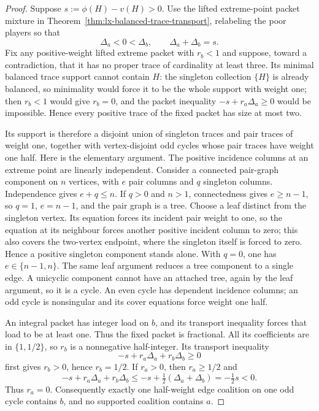 \begin{proof}
Suppose $s:=\phi(H)-v(H)>0$.  Use the lifted extreme-point packet mixture in
Theorem~\ref{thm:lx-balanced-trace-transport}, relabeling the poor players so
that
\[
 \Delta_a<0<\Delta_b,\qquad \Delta_a+\Delta_b=s.
 \tag{RT-1}\label{eq:lx-rank-two-signs}
\]
Fix any positive-weight lifted extreme packet with $r_b<1$ and suppose,
toward a contradiction, that it has no proper trace of cardinality at least
three.  Its minimal balanced trace support cannot contain $H$: the singleton
collection $\{H\}$ is already balanced, so minimality would force it to be
the whole support with weight one; then $r_b<1$ would give $r_b=0$, and the
packet inequality $-s+r_a\Delta_a\geq0$ would be impossible.  Hence every
positive trace of the fixed packet has size at most two.

Its support is therefore a disjoint union of singleton traces and pair
traces of weight one, together with vertex-disjoint odd cycles whose pair
traces have weight one half.  Here is the elementary argument.  The positive
incidence columns at an extreme point are linearly independent.  Consider a
connected pair-graph component on $n$ vertices, with $e$ pair columns and $q$
singleton columns.  Independence gives $e+q\leq n$.  If $q>0$ and $n>1$,
connectedness gives $e\geq n-1$, so $q=1$, $e=n-1$, and the pair graph is a
tree.  Choose a leaf distinct from the singleton vertex.  Its equation forces
its incident pair weight to one, so the equation at its neighbour forces
another positive incident column to zero; this also covers the two-vertex
endpoint, where the singleton itself is forced to zero.  Hence a positive
singleton component stands alone.  With $q=0$, one has
$e\in\{n-1,n\}$.  The same leaf argument reduces a tree component to a single
edge.  A unicyclic component cannot have an attached tree, again by the leaf
argument, so it is a cycle.  An even cycle has dependent incidence columns;
an odd cycle is nonsingular and its cover equations force weight one half.

An integral packet has integer load on $b$, and its transport inequality
forces that load to be at least one.  Thus the fixed packet is fractional.
All its coefficients are in $\{1,1/2\}$, so $r_b$ is a
nonnegative half-integer.  Its transport inequality
\[
 -s+r_a\Delta_a+r_b\Delta_b\geq0                 \tag{RT-2}
 \label{eq:lx-rank-two-packet}
\]
first gives $r_b>0$, hence $r_b=1/2$.  If $r_a>0$, then
$r_a\geq1/2$ and
\[
 -s+r_a\Delta_a+r_b\Delta_b
 \leq -s+\tfrac12(\Delta_a+\Delta_b)=-\tfrac12s<0.
\]
Thus $r_a=0$.  Consequently exactly one half-weight edge coalition on one odd
cycle contains $b$, and no supported coalition contains $a$.


\end{proof}
